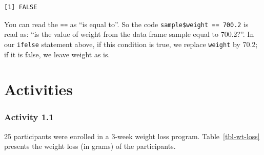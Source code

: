 \documentclass[
  a4paper,
]{memoir}
\begin{document}
\begin{verbatim}
[1] FALSE
\end{verbatim}

You can read the \texttt{==} as ``is equal to''. So the code
\texttt{sample\$weight\ ==\ 700.2} is read as: ``is the value of weight
from the data frame sample equal to 700.2?''. In our \texttt{ifelse}
statement above, if this condition is true, we replace \texttt{weight}
by 70.2; if it is false, we leave weight as is.

\newpage{}


\chapter*{Activities}\label{activities}


\subsection*{Activity 1.1}\label{activity-1.1}

25 participants were enrolled in a 3-week weight loss program.
Table~\ref{tbl-wt-loss} presents the weight loss (in grams) of the
participants.

\begin{table}[H]

\caption{\label{tbl-wt-loss}Weight loss (g) for 25 participants}


\end{table}%
\end{document}
